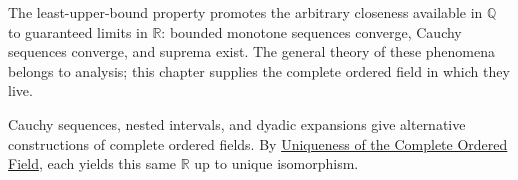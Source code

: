 \begin{remark*}
The least-upper-bound property promotes the arbitrary closeness available in
$\mathbb{Q}$ to guaranteed limits in $\mathbb{R}$: bounded monotone sequences
converge, Cauchy sequences converge, and suprema exist. The general theory of
these phenomena belongs to analysis; this chapter supplies the complete ordered
field in which they live.
\end{remark*}

\begin{remark*}
Cauchy sequences, nested intervals, and dyadic expansions give alternative
constructions of complete ordered fields. By
\hyperref[thm:uniqueness-of-cof]{Uniqueness of the Complete Ordered Field},
each yields this same $\mathbb{R}$ up to unique isomorphism.
\end{remark*}
